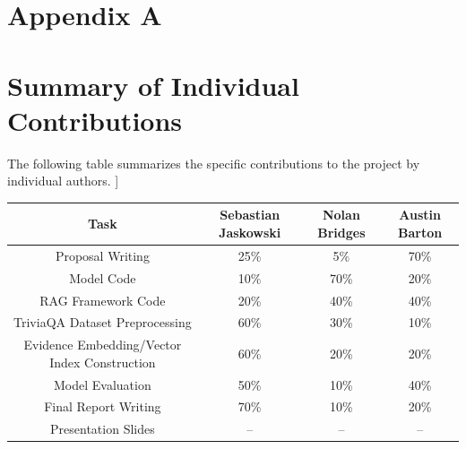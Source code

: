 \documentclass[11pt]{article}
\begin{document}
\section*{Appendix A}
\appendix{}
\section{Summary of Individual Contributions}
The following table summarizes the specific contributions to the project by individual authors.
\newline
]
\begin{table}[h]
    \centering
    \begin{tabular}{|c|c|c|c|} 
     \hline
     Task & Sebastian Jaskowski & Nolan Bridges & Austin Barton \\
     \hline
     \hline
     Proposal Writing  &25\% & 5\% & 70\% \\
     \hline
     Model Code & 10\% & 70\% & 20\% \\
     \hline
     RAG Framework Code & 20\% & 40\% & 40\% \\
     \hline
     TriviaQA Dataset Preprocessing & 60\% & 30\% & 10\%\\
     \hline
     Evidence Embedding/Vector Index Construction & 60\% & 20\% & 20\%\\
     \hline
     Model Evaluation & 50\% & 10\% & 40\%\\
     \hline
     Final Report Writing & 70\% & 10\% & 20\% \\
     \hline
     Presentation Slides & -- & -- & --\\
     \hline
    \end{tabular}
\end{table}
\end{document}
